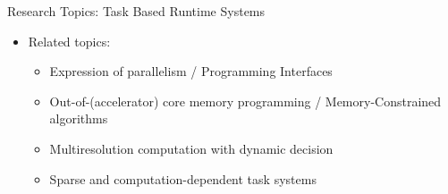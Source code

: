 {\begin{overlayarea}{\linewidth}{0cm}
{\begin{center}
\begin{minipage}{.9\linewidth}
\begin{block}{Research Topics: Task Based Runtime Systems}
\begin{itemize}
                \begin{itemize}
                \item Networks with deep hierarchies / Manycore / NUMA / Accelerators
                \item Separation of concerns: going beyond MPI+X
                \item Management of asynchrony
                \item Overlap of computations and data movement
                \end{itemize}
            \item Related topics:
                \begin{itemize}
                \item Expression of parallelism / Programming Interfaces
                \item Out-of-(accelerator) core memory programming / Memory-Constrained algorithms
                \item Multiresolution computation with dynamic decision
                \item Sparse and computation-dependent task systems
                \end{itemize}
            \end{itemize}
          \end{block}
        \end{minipage}
      \end{center}
    }
  \end{overlayarea}

}   
    

